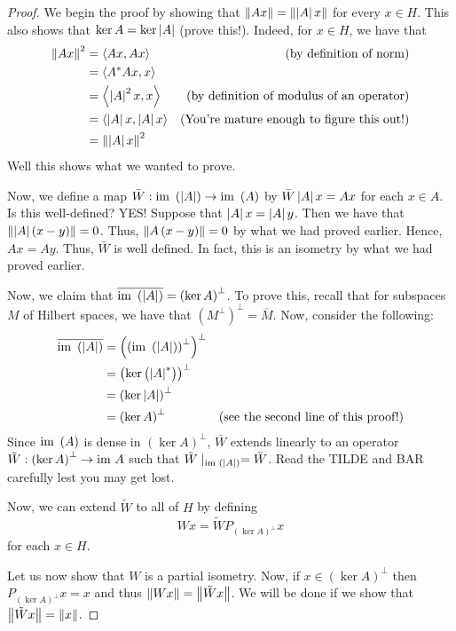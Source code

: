 \begin{proof}
    We begin the proof by showing that $\left\lVert Ax \right\rVert= \left\lVert \left\lvert A \right\rvert x \right\rVert$ for every $x\in H$. This also shows that $\ker A = \ker \left\lvert A \right\rvert$ (prove this!). Indeed, for $x\in H$, we have that
    \begin{align*}
	\left\lVert Ax \right\rVert^{2} &= \left\langle Ax,Ax \right\rangle & \text{(by definition of norm)} \\
	&= \left\langle A^{*}Ax,x \right\rangle \\
	&= \left\langle \left\lvert A \right\rvert^{2}x,x \right\rangle & \text{(by definition of modulus of an operator)} \\
	&= \left\langle \left\lvert A \right\rvert x, \left\lvert A \right\rvert x \right\rangle & \text{(You're mature enough to figure this out!)} \\
	&= \left\lVert \left\lvert A \right\rvert x \right\rVert^{2}
    \end{align*}
Well this shows what we wanted to prove.

Now, we define a map $\bar{W} : {\text{im }} \left( \left\lvert A \right\rvert \right) \to {\text{im }}\left( A \right)$ by $\bar{W}\left\lvert A \right\rvert x=Ax$ for each $x\in A$. Is this well-defined? YES! Suppose that $\left\lvert A \right\rvert x = \left\lvert A \right\rvert y$. Then we have that $\left\lVert \left\lvert A \right\rvert\left( x-y \right) \right\rVert=0$. Thus, $\left\lVert A\left( x-y \right) \right\rVert=0$ by what we had proved earlier. Hence, $Ax=Ay$. Thus, $\bar{W}$ is well defined. In fact, this is an isometry by what we had proved earlier.

Now, we claim that $\overline{{\text{im }} \left( \left\lvert A \right\rvert \right)}=\left( \ker A \right)^{\perp}$. To prove this, recall that for subspaces $M$ of Hilbert spaces, we have that $\left( M^{\perp} \right)^{\perp}=\overline{M}$. Now, consider the following:
\begin{align*}
    \overline{{\text{im }}\left( \left\lvert A \right\rvert \right)} &= \left( \left( {\text{im }} \left( \left\lvert A \right\rvert \right) \right)^{\perp} \right) ^{\perp} \\
    &= \left( \ker \left( \left\lvert A \right\rvert^{*} \right) \right)^{\perp} \\
    &= \left( \ker \left\lvert A \right\rvert \right)^{\perp} \\
    &= \left( \ker A \right)^{\perp} & \text{(see the second line of this proof!)}
\end{align*}
Since ${\text{im }} \left( A \right)$ is dense in $\left( \ker A \right)^{\perp}$, $\bar W$ extends linearly to an operator $\tilde{W} : \left( \ker A \right)^{\perp} \to {\text{im }} A$ such that $\tilde{W} \mid _{{\text{im }} \left( \left\lvert A \right\rvert \right)} = \bar{W}$. Read the TILDE and BAR carefully lest you may get lost.

Now, we can extend $\tilde{W}$ to all of $H$ by defining
\begin{equation*}
Wx=\tilde{W}P_{\left( \ker A \right)^{\perp}}x
\end{equation*}
for each $x\in H$.

Let us now show that $W$ is a partial isometry. Now, if $x\in \left( \ker A \right)^{\perp}$ then $P_{\left( \ker A \right)^{\perp}}x = x$ and thus $\left\lVert Wx \right\rVert=\left\lVert \tilde{W}x \right\rVert$. We will be done if we show that $\left\lVert \tilde{W}x \right\rVert=\left\lVert x \right\rVert$. 


\end{proof}


